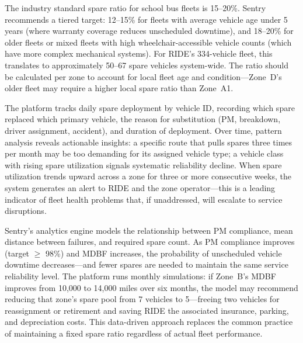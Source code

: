 \begin{description}[style=nextline, leftmargin=0.5cm]
    \item[\faIcon{percent} \textbf{Target Spare Ratio:}] The industry standard spare ratio for school bus fleets is 15--20\%. Sentry recommends a tiered target: 12--15\% for fleets with average vehicle age under 5 years (where warranty coverage reduces unscheduled downtime), and 18--20\% for older fleets or mixed fleets with high wheelchair-accessible vehicle counts (which have more complex mechanical systems). For RIDE's 334-vehicle fleet, this translates to approximately 50--67 spare vehicles system-wide. The ratio should be calculated per zone to account for local fleet age and condition---Zone~D's older fleet may require a higher local spare ratio than Zone~A1.

    \item[\faIcon{sync-alt} \textbf{Dynamic Spare Deployment:}] The platform tracks daily spare deployment by vehicle ID, recording which spare replaced which primary vehicle, the reason for substitution (PM, breakdown, driver assignment, accident), and duration of deployment. Over time, pattern analysis reveals actionable insights: a specific route that pulls spares three times per month may be too demanding for its assigned vehicle type; a vehicle class with rising spare utilization signals systematic reliability decline. When spare utilization trends upward across a zone for three or more consecutive weeks, the system generates an alert to RIDE and the zone operator---this is a leading indicator of fleet health problems that, if unaddressed, will escalate to service disruptions.

    \item[\faIcon{balance-scale} \textbf{Right-Sizing the Spare Pool:}] Sentry's analytics engine models the relationship between PM compliance, mean distance between failures, and required spare count. As PM compliance improves (target $\geq$ 98\%) and MDBF increases, the probability of unscheduled vehicle downtime decreases---and fewer spares are needed to maintain the same service reliability level. The platform runs monthly simulations: if Zone~B's MDBF improves from 10,000 to 14,000 miles over six months, the model may recommend reducing that zone's spare pool from 7 vehicles to 5---freeing two vehicles for reassignment or retirement and saving RIDE the associated insurance, parking, and depreciation costs. This data-driven approach replaces the common practice of maintaining a fixed spare ratio regardless of actual fleet performance.
\end{description}

